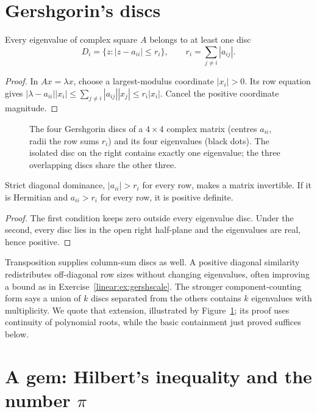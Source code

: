 \section{Gershgorin's discs}
\begin{theorem}[Gershgorin, 1931]\label{linear:thm:gershgorin}
Every eigenvalue of complex square $A$ belongs to at least one disc
\[D_i=\{z:|z-a_{ii}|\le r_i\},\qquad r_i=\sum_{j\ne i}|a_{ij}|.\]
\end{theorem}
\begin{proof}
In $Ax=\lambda x$, choose a largest-modulus coordinate $|x_i|>0$. Its row equation gives $|\lambda-a_{ii}||x_i|\le\sum_{j\ne i}|a_{ij}||x_j|\le r_i|x_i|$. Cancel the positive coordinate magnitude.
\end{proof}
\begin{figure}[ht]
\centering
{}
\caption{The four Gershgorin discs of a $4\times4$ complex matrix (centres $a_{ii}$, radii the row sums $r_i$) and its four eigenvalues
(black dots). The isolated disc on the right contains exactly one eigenvalue; the three overlapping discs share the other three.}
\label{linear:fig:gershgorin}
\end{figure}

\begin{corollary}\label{linear:cor:diagdom}
Strict diagonal dominance, $|a_{ii}|>r_i$ for every row, makes a matrix invertible. If it is Hermitian and $a_{ii}>r_i$ for every row, it is positive definite.
\end{corollary}
\begin{proof}
The first condition keeps zero outside every eigenvalue disc. Under the second, every disc lies in the open right half-plane and the eigenvalues are real, hence positive.
\end{proof}

Transposition supplies column-sum discs as well. A positive diagonal similarity redistributes off-diagonal row sizes without changing eigenvalues, often improving a bound as in Exercise~\ref{linear:ex:gershscale}. The stronger component-counting form says a union of $k$ discs separated from the others contains $k$ eigenvalues with multiplicity. We quote that extension, illustrated by Figure~\ref{linear:fig:gershgorin}; its proof uses continuity of polynomial roots, while the basic containment just proved suffices below.

\section{A gem: Hilbert's inequality and the number $\pi$}

